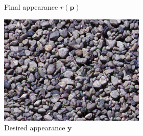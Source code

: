 \begin{figure}[]
\begin{subfigure}{\textwidth}
\begin{subfigure}{0.78\textwidth}
\begin{subfigure}{0.32\textwidth}
            \end{subfigure}
            \caption*{Final appearance \(r(\bm{p})\)}
        \end{subfigure}

        \begin{subfigure}{0.2\textwidth}
            \centering
            \includegraphics[width=\textwidth]{images/04-experiment02/photo/pebbles/target.jpg}
            \caption*{Desired appearance \(\bm{y}\)}
        \end{subfigure}
        \hfill
        \begin{subfigure}{0.78\textwidth}
            \centering
            \begin{subfigure}{0.32\textwidth}
                \centering
\end{subfigure}
\end{subfigure}
\end{subfigure}
\end{figure}

